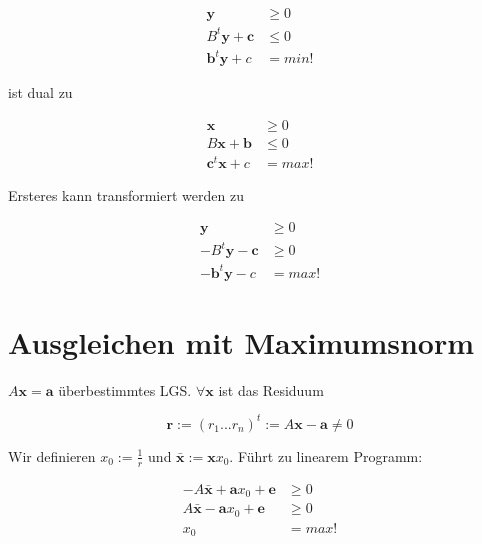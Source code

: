 \documentclass[8pt, DIV15, twocolumn]{scrartcl}
\begin{document}
\begin{equation*}
\begin{aligned}
\mathbf{y} &\geq 0 \\
B^t \mathbf{y} + \mathbf{c} &\leq 0 \\
\mathbf{b}^t \mathbf{y} + c &= min!
\end{aligned}
\end{equation*}

ist dual zu

\begin{equation*}
\begin{aligned}
\mathbf{x} &\geq 0 \\
B \mathbf{x} + \mathbf{b} &\leq 0 \\
\mathbf{c}^t \mathbf{x} + c &= max!
\end{aligned}
\end{equation*}

Ersteres kann transformiert werden zu

\begin{equation*}
\begin{aligned}
\mathbf{y} &\geq 0 \\
-B^t \mathbf{y} - \mathbf{c} &\geq 0 \\
-\mathbf{b}^t \mathbf{y} - c &= max!
\end{aligned}
\end{equation*}

\section*{Ausgleichen mit Maximumsnorm}
$A\mathbf{x} = \mathbf{a}$ überbestimmtes LGS. $\forall \mathbf{x}$ ist das Residuum

\begin{equation*}
\mathbf{r} := \left(r_1 ... r_n \right)^t := A \mathbf{x} - \mathbf{a} \neq 0
\end{equation*}

Wir definieren $x_0 := \frac{1}{r}$ und $\bar{\mathbf{x}} := \mathbf{x} x_0$. Führt zu linearem Programm:

\begin{equation*}
\begin{aligned}
-A\bar{\mathbf{x}} + \mathbf{a} x_0 + \mathbf{e} &\geq 0 \\
A\bar{\mathbf{x}} - \mathbf{a} x_0 + \mathbf{e} &\geq 0 \\
x_0 &= max!
\end{aligned}
\end{equation*}
\end{document}
